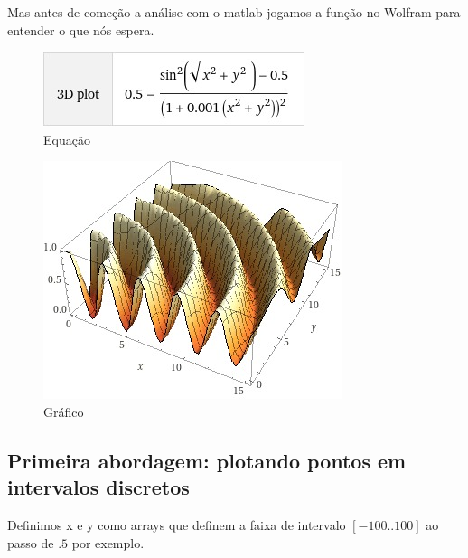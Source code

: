 \documentclass{article}
\begin{document}
Mas antes de começão a análise com o matlab jogamos a função no Wolfram para entender o que nós espera.

\begin{figure}[h!]
\centering
\includegraphics[scale=.5]{images/wolfram2.jpeg}
\caption{Equação}
\label{fig:wolfram_2}
\end{figure}

\begin{figure}[h!]
\centering
\includegraphics[scale=.5]{images/wolfram1.jpeg}
\caption{Gráfico}
\label{fig:wolfram_1}
\end{figure}


\newpage
\subsection*{Primeira abordagem: plotando pontos em intervalos discretos}

Definimos x e y como arrays que definem a faixa de intervalo
$[-100..100]$ ao passo de $.5$ por exemplo.



\end{document}
